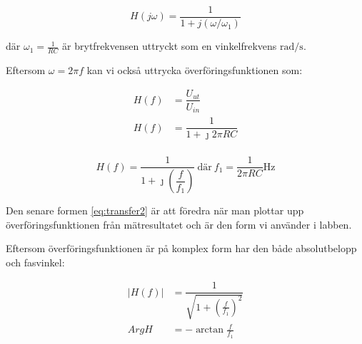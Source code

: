 \begin{equation}\label{eq:transfer}
    H(j\omega) = \dfrac{1}{1+j(\omega/\omega_1)}
\end{equation}

där $\omega_1 = \tfrac{1}{R C}$ är brytfrekvensen uttryckt som en
vinkelfrekvens $\si{\radian\per\second}$.


\par Eftersom $\omega = 2 \pi f$ kan vi också uttrycka överföringsfunktionen som:

\begin{equation*}
    \begin{split}
        H(f) &= \dfrac{U_{ut}}{U_{in}}        \\
        H(f) &= \dfrac{1}{1+\jmath 2 \pi R C} \\
    \end{split}
\end{equation*}

\begin{equation}\label{eq:transfer2}
    H(f) = \dfrac{1}{1+\jmath (\dfrac{f}{f_1})}\ \text{där}\ f_1 = \dfrac{1}{2 \pi R C} \si{\Hz}
\end{equation}


\par Den senare formen \eqref{eq:transfer2} är att föredra när man plottar
upp överföringsfunktionen från mätresultatet och är den form vi använder i
labben.

Eftersom överföringsfunktionen är på komplex form har den både absolutbelopp och fasvinkel:

\begin{equation}
    \begin{split}
        |H(f)| &= \dfrac{1}{\sqrt{1+(\frac{f}{f_1})^2}} \\
          ArgH &= -\arctan{\frac{f}{f_1}}
    \end{split}
\end{equation}




